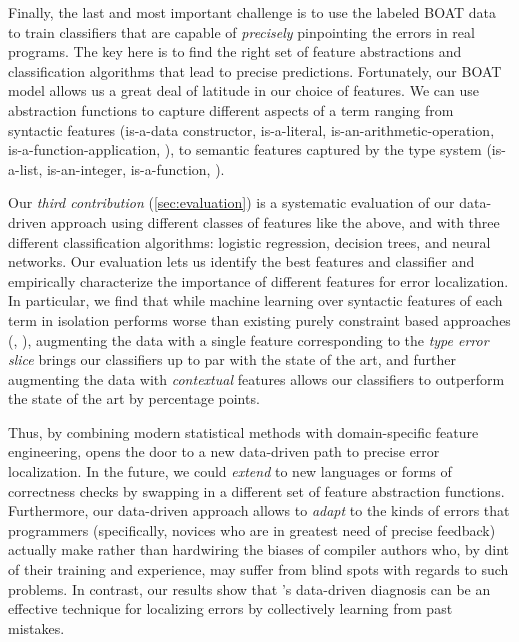 %
Finally, the last and most important challenge is to
use the labeled BOAT data to train classifiers that
are capable of \emph{precisely} pinpointing the errors
in real programs.
%
The key here is to find the right set of feature
abstractions and classification algorithms that
lead to precise predictions.
%
Fortunately, our BOAT model allows us a great deal of
latitude in our choice of features.
%
We can use abstraction functions to capture different
aspects of a term ranging from
%
syntactic features (\eg is-a-data constructor, is-a-literal,
is-an-arithmetic-operation, is-a-function-application, \etc),
%
to semantic features captured by the type system (\eg is-a-list,
is-an-integer, is-a-function, \etc).

Our \emph{third contribution} (\autoref{sec:evaluation})
is a systematic evaluation of our data-driven approach
using different classes of features like the above, and
with three different classification algorithms: logistic
regression, decision trees, and neural networks.
%
Our evaluation lets us identify the best features and
classifier and empirically characterize the importance
of different features for error localization.
%
In particular, we find that while machine learning
over syntactic features of each term in isolation
performs worse than existing
purely constraint based approaches (\eg \ocaml, \sherrloc),
augmenting the data with a single feature corresponding to
the \emph{type error slice} \citep{Tip2001-qp} brings our
classifiers up to par with the state of the art,
and further augmenting the data with \emph{contextual}
features allows our classifiers to outperform
the state of the art by \ToolnameWinSherrloc percentage points.

Thus, by combining modern statistical methods
with domain-specific feature engineering, \toolname
opens the door to a new data-driven path to
precise error localization.
%
In the future, we could \emph{extend}
\toolname to new languages or forms
of correctness checks by swapping in
a different set of feature abstraction
functions.
%
Furthermore, our data-driven approach
allows \toolname to \emph{adapt} to
the kinds of errors that programmers
(specifically, novices who are in greatest
need of precise feedback) actually make
rather than hardwiring the biases of
compiler authors who, by dint of their
training and experience, may suffer from
blind spots with regards to such problems.
%
In contrast, our results show that \toolname's
data-driven diagnosis can be an effective
technique for localizing errors by collectively
learning from past mistakes.

